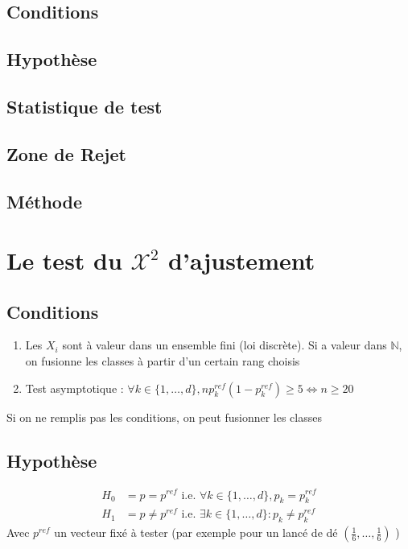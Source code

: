 \documentclass{article}
\theoremstyle{plain}%
\theoremstyle{definition}
\theoremstyle{remark}
\begin{document}
\subsection*{Conditions}
\subsection*{Hypothèse}
\subsection*{Statistique de test}
\subsection*{Zone de Rejet}
\subsection*{Méthode}

\section{Le test du $ \mathcal{X}^2 $ d'ajustement}
\subsection*{Conditions}
\begin{enumerate}
    \item Les $ X_i $ sont à valeur dans un ensemble fini (loi discrète). Si a valeur dans $ \mathbb{N} $, on fusionne les classes à partir d'un certain rang choisis 
    \item Test asymptotique : $ \forall k \in \{1, \dots, d\}, np_k^{ref}(1-p_k^{ref}) \geq 5 \Leftrightarrow n \geq 20$ 
\end{enumerate}
Si on ne remplis pas les conditions, on peut fusionner les classes 

\subsection*{Hypothèse}
\begin{align*}
    H_0 &= p = p^{ref} \text{ i.e. } \forall k \in \{1,\dots,d\}, p_k = p_k^{ref} \\
    H_1 &= p \neq p^{ref} \text{ i.e. } \exists k \in \{1, \dots, d\}: p_k \neq p_k^{ref}
\end{align*}
Avec $ p^{ref} $ un vecteur fixé à tester (par exemple pour un lancé de dé $ (\frac{1}{6}, \dots, \frac{1}{6}) $ )
\end{document}
